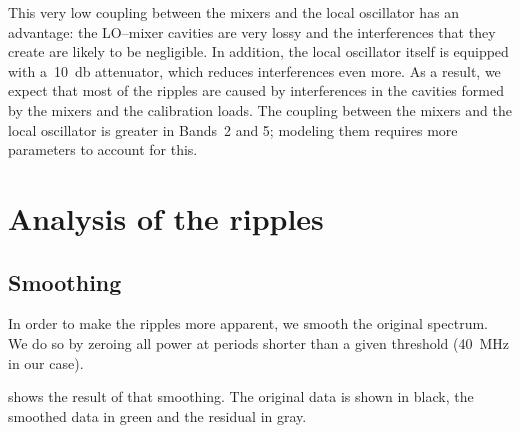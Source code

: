 This very low coupling between the mixers and the local oscillator has an advantage: the LO--mixer cavities are very lossy and the interferences that they create are likely to be negligible.
In addition, the local oscillator itself is equipped with a~\SI{10}{\decibel} attenuator, which reduces interferences even more.
As a result, we expect that most of the ripples are caused by interferences in the cavities formed by the mixers and the calibration loads.
The coupling between the mixers and the local oscillator is greater in Bands~2 and 5; modeling them requires more parameters to account for this.





\FloatBarrier



\section{Analysis of the ripples}




\subsection{Smoothing}
In order to make the ripples more apparent, we smooth the original spectrum.
We do so by zeroing all power at periods shorter than a given threshold (\SI{40}{\mega\hertz} in our case).

 shows the result of that smoothing.
The original data is shown in black, the smoothed data in green and the residual in gray.

